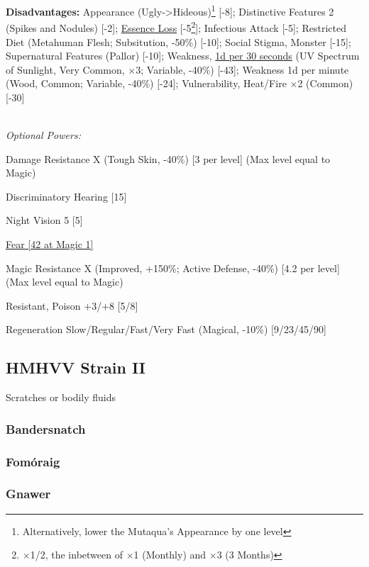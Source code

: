 \begin{multicols*}{3}
	\textbf{Disadvantages:}	
	Appearance (Ugly->Hideous)\footnote{Alternatively, lower the Mutaqua's Appearance by one level} [-8]; Distinctive Features 2 (Spikes and Nodules) [-2]; \hyperref[essence_loss]{Essence Loss} [-5\footnote{$\times$1/2, the inbetween of $\times$1 (Monthly) and $\times$3 (3 Months)}]; Infectious Attack [-5]; Restricted Diet (Metahuman Flesh; Subsitution, -50\%) [-10]; Social Stigma, Monster [-15]; Supernatural Features (Pallor) [-10]; Weakness, \textcolor{Blue}{\href{http://forums.sjgames.com/showpost.php?p=149688&postcount=7}{1d per 30 seconds}} (UV Spectrum of Sunlight, Very Common, $\times$3; Variable, -40\%) [-43]; Weakness 1d per minute (Wood, Common; Variable, -40\%) [-24]; Vulnerability, Heat/Fire $\times$2 (Common) [-30]
	
	\textit{\\Optional Powers:}
		
	Damage Resistance X (Tough Skin, -40\%) [3 per level] (Max level equal to Magic)
		
	Discriminatory Hearing [15]

	Night Vision 5 [5]
	
	\hyperref[fear]{Fear [42 at Magic 1]}
	
	Magic Resistance X (Improved, +150\%; Active Defense, -40\%) [4.2 per level] (Max level equal to Magic)
	
	Resistant, Poison +3/+8 [5/8]
	
	Regeneration Slow/Regular/Fast/Very Fast (Magical, -10\%) [9/23/45/90]	
	
	\subsection*{HMHVV Strain II}
	
	Scratches or bodily fluids
	
	\subsubsection{Bandersnatch}\label{bandersnatch}
	
	\subsubsection{Fomóraig}\label{formoraig}
	
	\subsubsection{Gnawer}\label{gnawer}
	

\end{multicols*}
